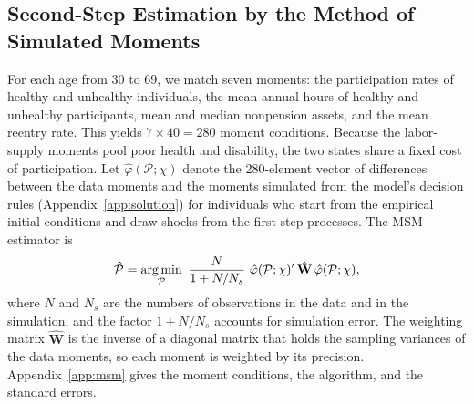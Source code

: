 \begin{table}[!htbp]
\centering
\caption{First-Step and Calibrated Parameters}\label{tab:calibrated}
\small

\end{table}

\subsection{Second-Step Estimation by the Method of Simulated Moments}

For each age from 30 to 69, we match seven moments: the participation rates of healthy and unhealthy individuals, the mean annual hours of healthy and unhealthy participants, mean and median nonpension assets, and the mean reentry rate. This yields $7\times 40=280$ moment conditions. Because the labor-supply moments pool poor health and disability, the two states share a fixed cost of participation. Let $\hat{\varphi}(\mathcal{P};\chi)$ denote the 280-element vector of differences between the data moments and the moments simulated from the model's decision rules (Appendix~\ref{app:solution}) for individuals who start from the empirical initial conditions and draw shocks from the first-step processes. The MSM estimator is
\[
\hat{\mathcal{P}}=\argmin_{\mathcal{P}}\ \frac{N}{1+N/N_s}\ \hat{\varphi}(\mathcal{P};\chi)'\,\hat{\mathbf{W}}\,\hat{\varphi}(\mathcal{P};\chi),
\]
where $N$ and $N_s$ are the numbers of observations in the data and in the simulation, and the factor $1+N/N_s$ accounts for simulation error. The weighting matrix $\hat{\mathbf{W}}$ is the inverse of a diagonal matrix that holds the sampling variances of the data moments, so each moment is weighted by its precision. Appendix~\ref{app:msm} gives the moment conditions, the algorithm, and the standard errors.

